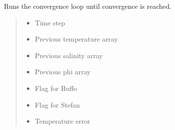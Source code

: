 \documentclass[a4paper,11pt,english,openany]{sphinxmanual}
\begin{document}
\begin{fulllineitems}
\begin{fulllineitems}
\label{\detokenize{api/spyice.models.sea_ice_model:src.spyice.models.sea_ice_model.SeaIceModel.run_while_convergence_iteration}}
\pysigstartsignatures
\pysiglinewithargsret
{}
{\sphinxparamcomma {}\sphinxparamcomma {}\sphinxparamcomma {}\sphinxparamcomma {}\sphinxparamcomma {}\sphinxparamcomma {}\sphinxparamcomma {}\sphinxparamcomma {}\sphinxparamcomma {}\sphinxparamcomma {}\sphinxparamcomma {}\sphinxparamcomma {}}
{}
\pysigstopsignatures
\sphinxAtStartPar
Runs the convergence loop until convergence is reached.
\begin{quote}\begin{description}
\begin{itemize}
\item {} 
\sphinxAtStartPar
{} \textendash{} Time step

\item {} 
\sphinxAtStartPar
{} \textendash{} Previous temperature array

\item {} 
\sphinxAtStartPar
{} \textendash{} Previous salinity array

\item {} 
\sphinxAtStartPar
{} \textendash{} Previous phi array

\item {} 
\sphinxAtStartPar
{} \textendash{} Flag for Buffo

\item {} 
\sphinxAtStartPar
{} \textendash{} Flag for Stefan

\item {} 
\sphinxAtStartPar
{} \textendash{} Temperature error


\end{itemize}
\end{description}
\end{quote}
\end{fulllineitems}
\end{fulllineitems}
\end{document}
